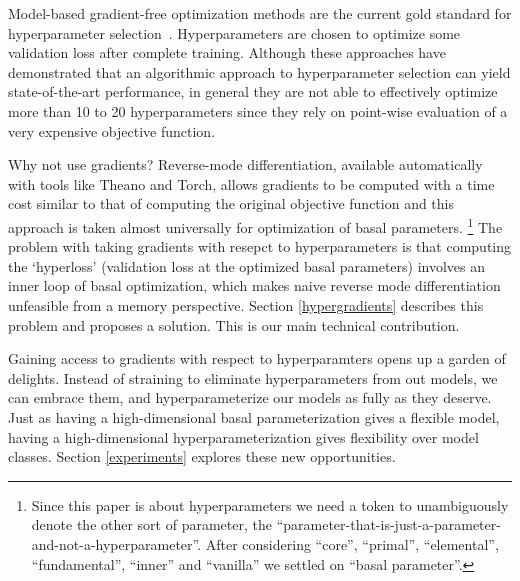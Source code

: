 \documentclass{article}
\newcommand{\primal}{basal }
\begin{document}
Model-based gradient-free optimization methods are the current gold standard for
hyperparameter selection~\cite{snoek2012practical, bergstra2011algorithms,
  BerYamCox13, HutHooLey11}. Hyperparameters are chosen to optimize some validation
loss after complete training. Although these approaches have demonstrated that an
algorithmic approach to hyperparameter selection can yield state-of-the-art
performance, in general they are not able to effectively optimize more than 10
to 20 hyperparameters since they rely on point-wise evaluation of a very
expensive objective function.

Why not use gradients? Reverse-mode differentiation, available automatically
with tools like Theano and Torch, allows gradients to be computed with a time
cost similar to that of computing the original objective function and this
approach is taken almost universally for optimization of \primal parameters.
\footnote{Since this paper is about hyperparameters we
  need a token to unambiguously denote the other sort of parameter, the
  ``parameter-that-is-just-a-parameter-and-not-a-hyperparameter''. After considering
  ``core'', ``primal'', ``elemental'', ``fundamental'', ``inner'' and
  ``vanilla'' we settled on ``\primal parameter''.}  The problem with taking gradients
with resepct to hyperparameters is that computing the `hyperloss' (validation
loss at the optimized \primal parameters) involves an inner loop of \primal
optimization, which makes naive reverse mode differentiation unfeasible from a
memory perspective. Section \ref{hypergradients} describes this problem and
proposes a solution. This is our main technical contribution.

Gaining access to gradients with respect to hyperparamters opens up a garden of
delights. Instead of straining to eliminate hyperparameters from out models, we
can embrace them, and hyperparameterize our models as fully as they
deserve. Just as having a high-dimensional \primal parameterization gives a
flexible model, having a high-dimensional hyperparameterization gives
flexibility over model classes. Section \ref{experiments} explores these new
opportunities.
\end{document}
